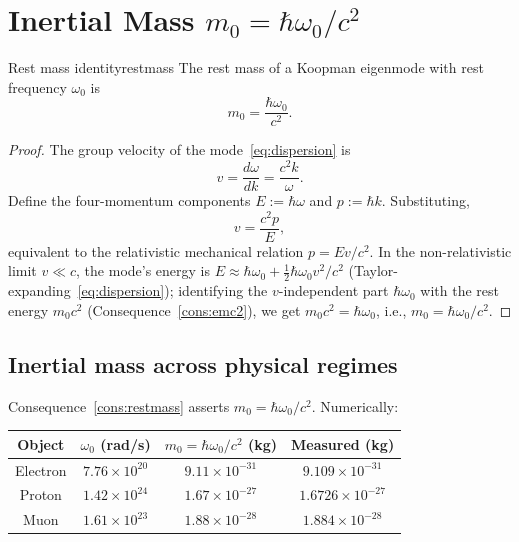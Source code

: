 \section{Inertial Mass $m_{0}=\hbar\omega_{0}/c^{2}$}
\label{sec:restmass}

\begin{consequence}{Rest mass identity}{restmass}
The rest mass of a Koopman eigenmode with rest frequency $\omega_{0}$ is
\begin{equation}
m_{0}=\frac{\hbar\omega_{0}}{c^{2}}.
\label{eq:restmass}
\end{equation}
\end{consequence}

\begin{proof}
The group velocity of the mode~\eqref{eq:dispersion} is
\begin{equation*}
v=\frac{d\omega}{dk}=\frac{c^{2}k}{\omega}.
\end{equation*}
Define the four-momentum components $E:=\hbar\omega$ and $p:=\hbar k$. Substituting,
\begin{equation*}
v=\frac{c^{2}p}{E},
\end{equation*}
equivalent to the relativistic mechanical relation $p=Ev/c^{2}$. In the non-relativistic limit $v\ll c$, the mode's energy is $E\approx\hbar\omega_{0}+\tfrac{1}{2}\hbar\omega_{0}v^{2}/c^{2}$ (Taylor-expanding~\eqref{eq:dispersion}); identifying the $v$-independent part $\hbar\omega_{0}$ with the rest energy $m_{0}c^{2}$ (Consequence~\ref{cons:emc2}), we get $m_{0}c^{2}=\hbar\omega_{0}$, i.e., $m_{0}=\hbar\omega_{0}/c^{2}$.
\end{proof}

\subsection{Inertial mass across physical regimes}

Consequence~\ref{cons:restmass} asserts $m_{0}=\hbar\omega_{0}/c^{2}$. Numerically:
\begin{center}
\begin{tabular}{c|c|c|c}
\toprule
Object & $\omega_{0}$ (rad/s) & $m_{0}=\hbar\omega_{0}/c^{2}$ (kg) & Measured (kg) \\
\midrule
Electron & $7.76\times 10^{20}$ & $9.11\times 10^{-31}$ & $9.109\times 10^{-31}$ \\
Proton & $1.42\times 10^{24}$ & $1.67\times 10^{-27}$ & $1.6726\times 10^{-27}$ \\
Muon & $1.61\times 10^{23}$ & $1.88\times 10^{-28}$ & $1.884\times 10^{-28}$ \\
\bottomrule
\end{tabular}
\end{center}

